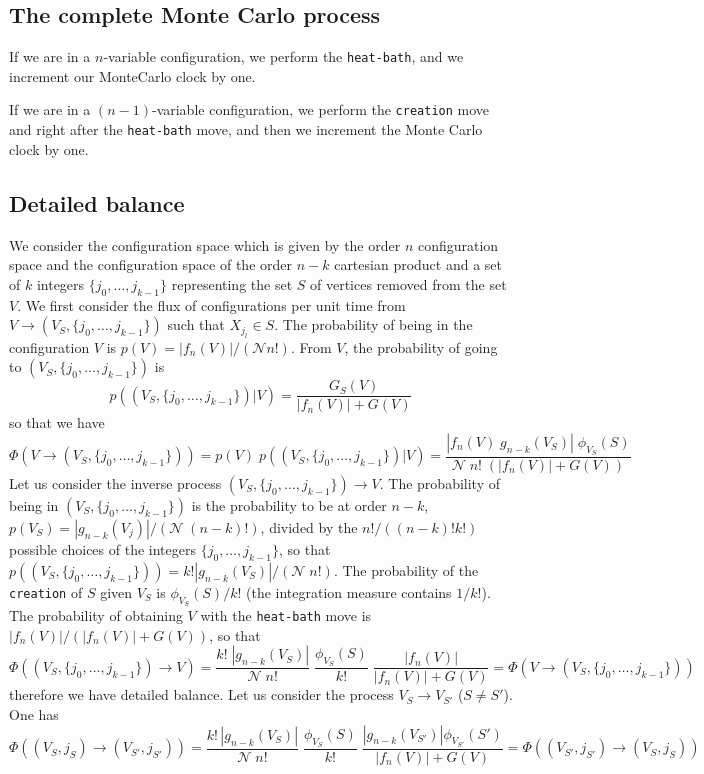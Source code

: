 \documentclass{article}
\begin{document}
\subsection{The complete Monte Carlo process}
If we are in a $n$-variable configuration, we perform the \texttt{heat-bath}, and we increment our MonteCarlo clock by one.

If we are in a $(n-1)$-variable configuration, we perform the \texttt{creation} move and right after the \texttt{heat-bath} move, and then we increment the Monte Carlo clock by one.
\subsection{Detailed balance}
We consider the configuration space which is given by the order $n$ configuration space and the configuration space of the order $n-k$ cartesian product and a set of $k$ integers $\{j_0,\dots, j_{k-1}\}$ representing the set $S$ of vertices removed from the set $V$.
We first consider the flux of configurations per unit time from $V\to (V_S,\{j_0,\dots, j_{k-1}\})$ such that $X_{j_l}\in S$. The probability of being in the configuration $V$ is $p(V) =|f_n(V)|/(\mathcal{N}n!)$. From $V$, the probability of going to $(V_S, \{j_0, \dots, j_{k-1}\})$ is
$$
p((V_S,\{j_0, \dots, j_{k-1}\})|V)=\frac{ G_S(V)}{|f_n(V)|+G(V)}
$$
so that we have
$$
\Phi(V \to (V_S,\{j_0, \dots, j_{k-1}\})) = p(V) \;p((V_S,\{j_0, \dots, j_{k-1}\})|V) = \frac{|f_n(V)\;g_{n-k}(V_S)|\;\phi_{V_S}(S)}{\mathcal{N}\;n!\;(|f_n(V)|+G(V))}
$$
Let us consider the inverse process $(V_S,\{j_0, \dots, j_{k-1}\})\to V$. The probability of being in $(V_S,\{j_0, \dots, j_{k-1}\})$ is the probability to be at order $n-k$, $p(V_S)=|g_{n-k}(V_j)|/(\mathcal{N}\;(n-k)!)$, divided by the $n!/((n-k)!k!)$ possible choices of the integers $\{j_0,\dots,j_{k-1}\}$, so that $p((V_S,\{j_0, \dots, j_{k-1}\}))= k!|g_{n-k}(V_S)|/(\mathcal{N}\; n!)$. The probability of the \texttt{creation} of $S$ given $V_S$ is $\phi_{V_S}(S)/k!$ (the integration measure contains $1/k!$). The probability of obtaining $V$ with the \texttt{heat-bath} move is $|f_n(V)|/(|f_n(V)|+G(V))$, so that
$$
\Phi((V_S,\{j_0, \dots, j_{k-1}\}) \to V) = \frac{k!\;|g_{n-k}(V_S)|}{\mathcal{N}\;n!}\; \frac{\phi_{V_S}(S)}{k!}\;\frac{|f_n(V)|}{|f_n(V)|+G(V)}=\Phi(V\to (V_S,\{j_0, \dots, j_{k-1}\}))
$$
therefore we have detailed balance. Let us consider the process $V_{S}\to V_{S'}$ ($S\neq S'$). One has
$$
\Phi((V_S, j_S)\to (V_{S'}, j_{S'}))= \frac{k!\,|g_{n-k}(V_S)|}{\mathcal{N}\;n!}\;\frac{\phi_{V_S}(S)}{k!}\;\frac{|g_{n-k}(V_{S'})|\phi_{V_{S'}}(S')}{|f_n(V)|+G(V)} =\Phi((V_{S'}, j_{S'})\to (V_{S}, j_{S}))
$$
\end{document}
